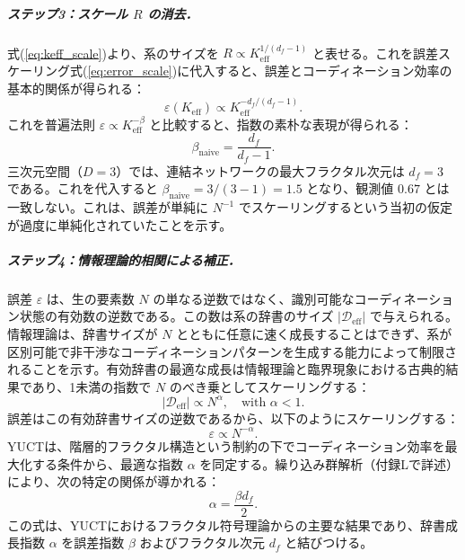 \documentclass[11pt,a4paper]{article}
\newcommand{\Ke}{K_{\mathrm{eff}}}
\theoremstyle{remark}
\begin{document}
	\subparagraph*{ステップ3：スケール \(R\) の消去．}
	式(\ref{eq:keff_scale})より、系のサイズを \(R \propto \Ke^{1/(d_f-1)}\) と表せる。これを誤差スケーリング式(\ref{eq:error_scale})に代入すると、誤差とコーディネーション効率の基本的関係が得られる：
	\begin{equation}
		\varepsilon(\Ke) \propto \Ke^{-d_f/(d_f-1)}.
		\label{eq:error_keff_naive}
	\end{equation}
	これを普遍法則 \(\varepsilon \propto \Ke^{-\beta}\) と比較すると、指数の素朴な表現が得られる：
	\begin{equation}
		\beta_{\text{naive}} = \frac{d_f}{d_f-1}.
		\label{eq:beta_naive}
	\end{equation}
	三次元空間（\(D = 3\)）では、連結ネットワークの最大フラクタル次元は \(d_f = 3\) である。これを代入すると \(\beta_{\text{naive}} = 3/(3-1) = 1.5\) となり、観測値 \(0.67\) とは一致しない。これは、誤差が単純に \(N^{-1}\) でスケーリングするという当初の仮定が過度に単純化されていたことを示す。
	
	\subparagraph*{ステップ4：情報理論的相関による補正．}
	誤差 \(\varepsilon\) は、生の要素数 \(N\) の単なる逆数ではなく、識別可能なコーディネーション状態の有効数の逆数である。この数は系の辞書のサイズ \(|\mathcal{D}_{\text{eff}}|\) で与えられる。情報理論は、辞書サイズが \(N\) とともに任意に速く成長することはできず、系が区別可能で非干渉なコーディネーションパターンを生成する能力によって制限されることを示す。有効辞書の最適な成長は情報理論と臨界現象における古典的結果であり、1未満の指数で \(N\) のべき乗としてスケーリングする：
	\begin{equation}
		|\mathcal{D}_{\text{eff}}| \propto N^{\alpha}, \quad \text{with } \alpha < 1.
		\label{eq:dict_scale}
	\end{equation}
	誤差はこの有効辞書サイズの逆数であるから、以下のようにスケーリングする：
	\begin{equation}
		\varepsilon \propto N^{-\alpha}.
		\label{eq:error_scale_corrected}
	\end{equation}
	YUCTは、階層的フラクタル構造という制約の下でコーディネーション効率を最大化する条件から、最適な指数 \(\alpha\) を同定する。繰り込み群解析（付録Lで詳述）により、次の特定の関係が導かれる：
	\begin{equation}
		\alpha = \frac{\beta d_f}{2}.
		\label{eq:alpha_from_beta}
	\end{equation}
	この式は、YUCTにおけるフラクタル符号理論からの主要な結果であり、辞書成長指数 \(\alpha\) を誤差指数 \(\beta\) およびフラクタル次元 \(d_f\) と結びつける。
	
\end{document}
